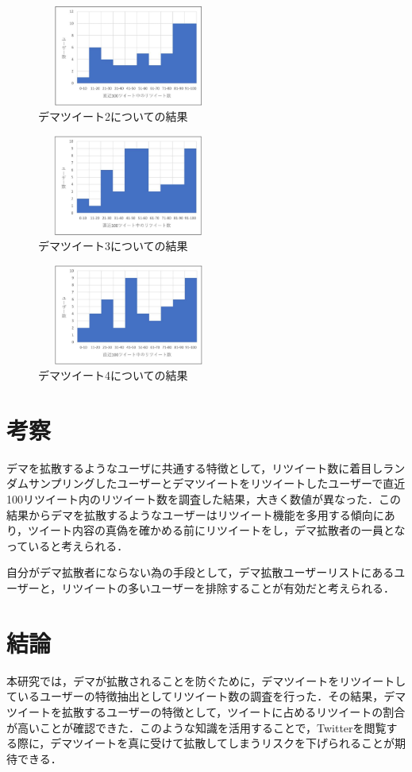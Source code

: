 \documentclass[uplatex,twocolumn]{jsarticle}
\begin{document}
\begin{figure}[htbp]
\centering
\includegraphics[clip,width=6.0cm,height=3.3cm]{d2.pdf}
\caption{デマツイート2についての結果}
\label{ヒストグラム2}
\end{figure}

\begin{figure}[htbp]
\centering
\includegraphics[clip,width=6.0cm,height=3.3cm]{d3.pdf}
\caption{デマツイート3についての結果}
\label{ヒストグラム3}
\end{figure}

\begin{figure}[htbp]
\centering
\includegraphics[clip,width=6.0cm,height=3.3cm]{d4.pdf}
\caption{デマツイート4についての結果}
\label{ヒストグラム4}
\end{figure}

\section{考察}
デマを拡散するようなユーザに共通する特徴として，リツイート数に着目しランダムサンプリングしたユーザーとデマツイートをリツイートしたユーザーで直近100リツイート内のリツイート数を調査した結果，大きく数値が異なった．この結果からデマを拡散するようなユーザーはリツイート機能を多用する傾向にあり，ツイート内容の真偽を確かめる前にリツイートをし，デマ拡散者の一員となっていると考えられる．

自分がデマ拡散者にならない為の手段として，デマ拡散ユーザーリストにあるユーザーと，リツイートの多いユーザーを排除することが有効だと考えられる．

\section{結論}
本研究では，デマが拡散されることを防ぐために，デマツイートをリツイートしているユーザーの特徴抽出としてリツイート数の調査を行った．その結果，デマツイートを拡散するユーザーの特徴として，ツイートに占めるリツイートの割合が高いことが確認できた．このような知識を活用することで，Twitterを閲覧する際に，デマツイートを真に受けて拡散してしまうリスクを下げられることが期待できる．

\end{document}
